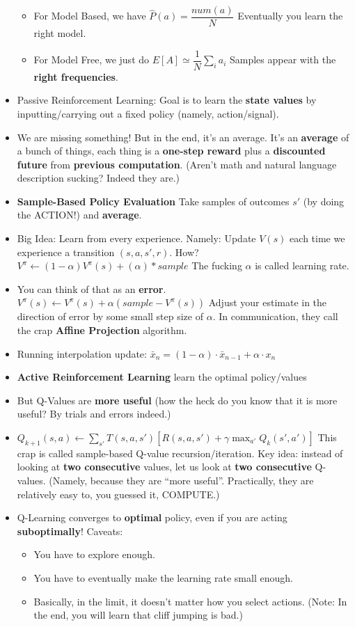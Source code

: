 \documentclass[twocolumn]{article}
\begin{document}
\begin{itemize}
\begin{itemize}
  \item For Model Based, we have $\hat{P}(a)=\dfrac{num(a)}{N}$
    Eventually you learn the right model.\\[1pt]
  \item For Model Free, we just do $E[A]\simeq \dfrac{1}{N}\sum_{i}
    a_{i}$ Samples appear with the \textbf{right frequencies}.
  \end{itemize}
\item Passive Reinforcement Learning: Goal is to learn the
  \textbf{state values} by inputting/carrying out a fixed policy
  (namely, action/signal).
\item We are missing something! But in the end, it's an average. It's
  an \textbf{average} of a bunch of things, each thing is a
  \textbf{one-step reward} plus a \textbf{discounted future} from
  \textbf{previous computation}. (Aren't math and natural language
  description sucking? Indeed they are.)
\item \textbf{Sample-Based Policy Evaluation} Take samples of outcomes
  $s'$ (by doing the ACTION!) and \textbf{average}.
\item Big Idea: Learn from every experience. Namely: Update $V(s)$
  each time we experience a transition $(s,a,s',r)$. How?
  $V^{\pi}\leftarrow (1-\alpha)V^{\pi}(s)+(\alpha)*sample$ The fucking
  $\alpha$ is called learning rate.
\item You can think of that as an
  \textbf{error}. $V^{\pi}(s)\leftarrow V^{\pi}(s)+\alpha (sample -
  V^{\pi}(s))$ Adjust your estimate in  the direction of error by some
  small step size of $\alpha$. In communication, they call the crap
  \textbf{Affine Projection} algorithm.
\item Running interpolation update: $\bar{x}_{n}=(1-\alpha)\cdot
  \bar{x}_{n-1}+\alpha\cdot x_{n}$
\item \textbf{Active Reinforcement Learning} {\color{red} learn the
    optimal policy/values}
\item But Q-Values are \textbf{more useful} (how the heck do you know
  that it is more useful? By trials and errors indeed.)
\item
  $Q_{k+1}(s,a)\leftarrow\sum_{s'}T(s,a,s')[R(s,a,s')+\gamma\displaystyle{\max_{a'}}Q_{k}(s',a')]$
  This crap is called sample-based Q-value recursion/iteration. Key
  idea: instead of looking at \textbf{two consecutive} {\color{red}
    values}, let us look at \textbf{two consecutive}
  Q-values. (Namely, because they are ``more useful''. Practically,
  they are relatively easy to, you guessed it, COMPUTE.)
\item Q-Learning converges to \textbf{optimal} policy, even if you are
  acting \textbf{suboptimally}! Caveats:
  \begin{itemize}
  \item You have to explore enough.
  \item You have to eventually make the learning rate small enough.
  \item Basically, in the limit, it doesn't matter how you select
    actions. (Note: In the end, you will learn that cliff jumping is
    bad.)
  \end{itemize}
\end{itemize}
\end{document}
